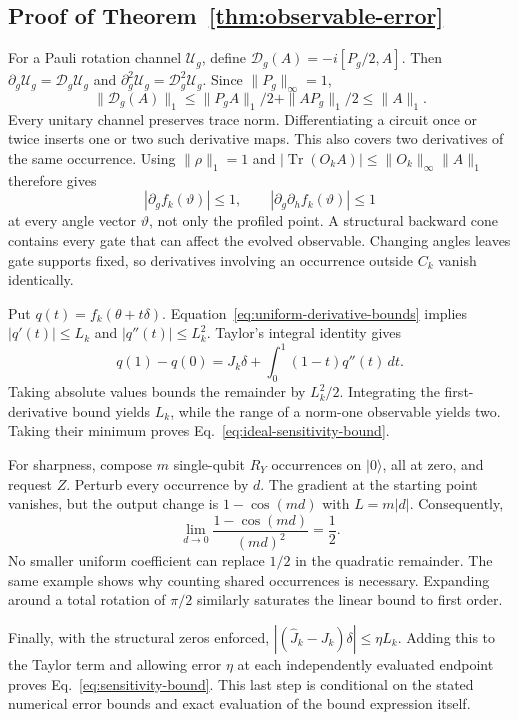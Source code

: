

\subsection{Proof of Theorem~\ref{thm:observable-error}}
\begin{IEEEproof}
For a Pauli rotation channel $\mathcal U_g$, define $\mathcal D_g(A)=-i[P_g/2,A]$. Then $\partial_g\mathcal U_g=\mathcal D_g\mathcal U_g$ and $\partial_g^2\mathcal U_g=\mathcal D_g^2\mathcal U_g$. Since $\|P_g\|_\infty=1$,
\begin{equation}
 \|\mathcal D_g(A)\|_1\leq\|P_gA\|_1/2+\|AP_g\|_1/2\leq\|A\|_1.
\end{equation}
Every unitary channel preserves trace norm. Differentiating a circuit once or twice inserts one or two such derivative maps. This also covers two derivatives of the same occurrence. Using $\|\rho\|_1=1$ and $|\operatorname{Tr}(O_k A)|\leq\|O_k\|_\infty\|A\|_1$ therefore gives
\begin{equation}
 |\partial_g f_k(\vartheta)|\leq1,\qquad
 |\partial_g\partial_h f_k(\vartheta)|\leq1
 \label{eq:uniform-derivative-bounds}
\end{equation}
at every angle vector $\vartheta$, not only the profiled point. A structural backward cone contains every gate that can affect the evolved observable. Changing angles leaves gate supports fixed, so derivatives involving an occurrence outside $C_k$ vanish identically.

Put $q(t)=f_k(\theta+t\delta)$. Equation~\eqref{eq:uniform-derivative-bounds} implies $|q'(t)|\leq L_k$ and $|q''(t)|\leq L_k^2$. Taylor's integral identity gives
\begin{equation}
 q(1)-q(0)=J_k\delta+\int_0^1(1-t)q''(t)\,dt.
\end{equation}
Taking absolute values bounds the remainder by $L_k^2/2$. Integrating the first-derivative bound yields $L_k$, while the range of a norm-one observable yields two. Taking their minimum proves Eq.~\eqref{eq:ideal-sensitivity-bound}.

For sharpness, compose $m$ single-qubit $R_Y$ occurrences on $|0\rangle$, all at zero, and request $Z$. Perturb every occurrence by $d$. The gradient at the starting point vanishes, but the output change is $1-\cos(md)$ with $L=m|d|$. Consequently,
\begin{equation}
 \lim_{d\to0}\frac{1-\cos(md)}{(m d)^2}=\frac12.
\end{equation}
No smaller uniform coefficient can replace $1/2$ in the quadratic remainder. The same example shows why counting shared occurrences is necessary. Expanding around a total rotation of $\pi/2$ similarly saturates the linear bound to first order.

Finally, with the structural zeros enforced, $|(\widehat J_k-J_k)\delta|\leq\eta L_k$. Adding this to the Taylor term and allowing error $\eta$ at each independently evaluated endpoint proves Eq.~\eqref{eq:sensitivity-bound}. This last step is conditional on the stated numerical error bounds and exact evaluation of the bound expression itself.
\end{IEEEproof}

